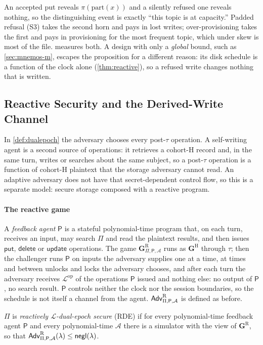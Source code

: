 An accepted put reveals $\pi(\mathrm{part}(x))$ and a silently refused one reveals nothing, so the
distinguishing event is exactly ``this topic is at capacity.'' Padded refusal (S3) takes the second
horn and pays in lost writes; over-provisioning takes the first and pays in provisioning for the
most frequent topic, which under skew is most of the file.  measures both. A
design with only a \emph{global} bound, such as \cref{sec:mnemos-m}, escapes the proposition for a
different reason: its disk schedule is a function of the clock alone (\cref{thm:reactive}), so a
refused write changes nothing that is written.

\subsection{Reactive Security and the Derived-Write Channel}
\label{sec:derived-write}

In \cref{def:dualepoch} the adversary chooses every post-$\tau$ operation. A self-writing agent is a
second source of operations: it retrieves a cohort-H record and, in the same turn, writes or
searches about the same subject, so a post-$\tau$ operation is a function of cohort-H plaintext that
the storage adversary cannot read. An adaptive adversary does not have that secret-dependent control
flow, so this is a separate model: secure storage composed with a reactive program.

\paragraph{The reactive game} A \emph{feedback agent} $\mathsf{P}$ is a stateful polynomial-time
program that, on each turn, receives an input, may search $\Pi$ and read the plaintext results, and
then issues $\mathsf{put}$, $\mathsf{delete}$ or $\mathsf{update}$ operations. The game
$\mathbf{G}^{\mathrm{R}}_{\Pi,\mathsf{P},\mathcal{A}}$ runs as $\mathbf{G}^{\mathrm{H}}$ through
$\tau$; then the challenger runs $\mathsf{P}$ on inputs the adversary supplies one at a time, at times
and between unlocks and locks the adversary chooses, and after each turn the adversary receives
$\mathcal{L}^{\mathrm{op}}$ of the operations $\mathsf{P}$ issued and nothing else: no output of
$\mathsf{P}$, no search result. $\mathsf{P}$ controls neither the clock nor the session boundaries,
so the schedule is not itself a channel from the agent. $\mathsf{Adv}^{\mathrm{R}}_{\Pi,\mathsf{P},\mathcal{A}}$ is
defined as before.

\begin{definition}
\label{def:reactive}
$\Pi$ is \emph{reactively $\mathcal{L}$-dual-epoch secure} (RDE) if for every polynomial-time
feedback agent $\mathsf{P}$ and every polynomial-time $\mathcal{A}$ there is a simulator with the
view of $\mathbf{G}^{\mathrm{R}}$, so that $\mathsf{Adv}^{\mathrm{R}}_{\Pi,\mathsf{P},\mathcal{A}}(\lambda) \le
\mathsf{negl}(\lambda)$.
\end{definition}

